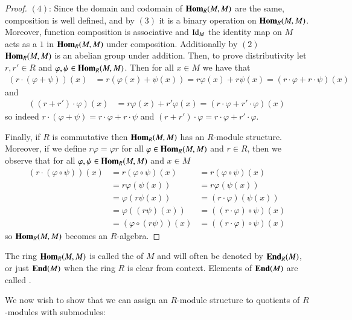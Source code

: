 \documentclass[12pt, a4paper, oneside, openright, titlepage]{book}
\begin{document}
\begin{proof}
    $(4)$: Since the domain and codomain of $\mathbf{Hom}_R(M,M)$ are the same, composition is well defined, and by $(3)$ it is a binary operation on $\mathbf{Hom}_R(M,M)$. Moreover, function composition is associative and $\operatorname{Id}_M$ the identity map on $M$ acts as a $1$ in $\mathbf{Hom}_R(M,M)$ under composition. Additionally by $(2)$ $\mathbf{Hom}_R(M,M)$ is an abelian group under addition. Then, to prove distributivity let $r,r' \in R$ and $\varphi,\psi \in \mathbf{Hom}_R(M,M)$. Then for all $x \in M$ we have that \begin{align*}
        (r\cdot(\varphi+\psi))(x) &= r(\varphi(x)+\psi(x)) = r\varphi(x)+r\psi(x) = (r\cdot\varphi+r\cdot\psi)(x)
    \end{align*}
    and \begin{align*}
        ((r+r')\cdot\varphi)(x) &= r\varphi(x)+r'\varphi(x) = (r\cdot\varphi+r'\cdot\varphi)(x)
    \end{align*}
    so indeed $r\cdot(\varphi+\psi) = r\cdot\varphi+r\cdot\psi$ and $(r+r')\cdot\varphi = r\cdot\varphi+r'\cdot\varphi$.
    
    Finally, if $R$ is commutative then $\mathbf{Hom}_R(M,M)$ has an $R$-module structure. Moreover, if we define $r\varphi = \varphi r$ for all $\varphi \in \mathbf{Hom}_R(M,M)$ and $r \in R$, then we observe that for all $\varphi,\psi \in \mathbf{Hom}_R(M,M)$ and $x \in M$ \begin{align*}
        (r\cdot(\varphi\circ\psi))(x) &=r(\varphi\circ\psi)(x) &= r(\varphi\circ\psi)(x) \\
        &=r\varphi(\psi(x))  &= r\varphi(\psi(x)) \\ 
        &= \varphi(r\psi(x)) &= (r\cdot\varphi)(\psi(x)) \\
        &= \varphi((r\psi)(x)) &= ((r\cdot\varphi)\circ\psi)(x) \\
        &= (\varphi\circ(r\psi))(x) &= ((r\cdot\varphi)\circ\psi)(x) 
    \end{align*}
    so $\mathbf{Hom}_R(M,M)$ becomes an $R$-algebra.
\end{proof}


\begin{defn}
    The ring $\mathbf{Hom}_R(M,M)$ is called the  of $M$ and will often be denoted by $\normalfont\textbf{End}_R(M)$, or just $\normalfont\textbf{End}(M)$ when the ring $R$ is clear from context. Elements of $\normalfont\textbf{End}(M)$ are called .
\end{defn}

We now wish to show that we can assign an $R$-module structure to quotients of $R$-modules with submodules:
\end{document}
